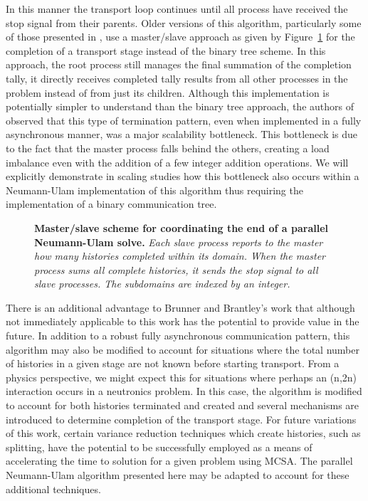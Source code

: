 In this manner the transport loop continues until all process have
received the stop signal from their parents. Older versions of this
algorithm, particularly some of those presented in
\citep{brunner_comparison_2006}, use a master/slave approach as given
by Figure~\ref{fig:master_comm_tree} for the completion of a transport
stage instead of the binary tree scheme. In this approach, the root
process still manages the final summation of the completion tally, it
directly receives completed tally results from all other processes in
the problem instead of from just its children. Although this
implementation is potentially simpler to understand than the binary
tree approach, the authors of \citep{brunner_comparison_2006} observed
that this type of termination pattern, even when implemented in a
fully asynchronous manner, was a major scalability bottleneck. This
bottleneck is due to the fact that the master process falls behind the
others, creating a load imbalance even with the addition of a few
integer addition operations. We will explicitly demonstrate in scaling
studies how this bottleneck also occurs within a Neumann-Ulam
implementation of this algorithm thus requiring the implementation of
a binary communication tree.

\begin{figure}[t!]
  \begin{center}
    \scalebox{0.75}{
       }
    \caption{\textbf{Master/slave scheme for coordinating the end of a
        parallel Neumann-Ulam solve.} \textit{Each slave process
        reports to the master how many histories completed within its
        domain. When the master process sums all complete histories,
        it sends the stop signal to all slave processes. The
        subdomains are indexed by an integer.}}
  \end{center}
  \label{fig:master_comm_tree}
\end{figure}

There is an additional advantage to Brunner and Brantley's work that
although not immediately applicable to this work has the potential to
provide value in the future. In addition to a robust fully
asynchronous communication pattern, this algorithm may also be modified
to account for situations where the total number of histories in a
given stage are not known before starting transport. From a physics
perspective, we might expect this for situations where perhaps an
(n,2n) interaction occurs in a neutronics problem. In this case, the
algorithm is modified to account for both histories terminated and
created and several mechanisms are introduced to determine completion
of the transport stage. For future variations of this work, certain
variance reduction techniques which create histories, such as
splitting, have the potential to be successfully employed as a means
of accelerating the time to solution for a given problem using
MCSA. The parallel Neumann-Ulam algorithm presented here may be
adapted to account for these additional techniques.


